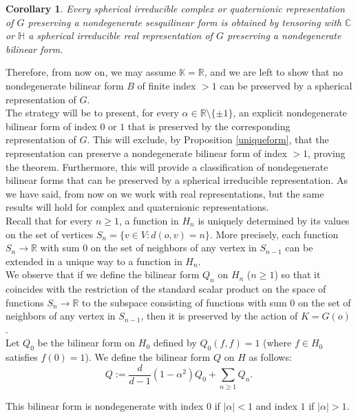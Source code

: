 \documentclass{article}
\theoremstyle{definition}
\theoremstyle{remark}
\theoremstyle{plain}
\newtheorem{cor}[dfn]{Corollary}
\begin{document}
\begin{cor} \label{tensor}
Every spherical irreducible complex or quaternionic representation of $G$ preserving a nondegenerate sesquilinear form is obtained by tensoring with $\mathbb{C}$ or $\mathbb{H}$ a spherical irreducible real representation of $G$ preserving a nondegenerate bilinear form. \\
\end{cor}

Therefore, from now on, we may assume $\mathbb{K}=\mathbb{R}$, and we are left to show that no nondegenerate bilinear form $B$ of finite index $>1$ can be preserved by a spherical representation of $G$. \\

The strategy will be to present, for every $\alpha\in\mathbb{R}\setminus\{\pm 1\}$, an explicit nondegenerate bilinear form of index $0$ or $1$ that is preserved by the corresponding representation of $G$. This will exclude, by Proposition \ref{uniqueform}, that the representation can preserve a nondegenerate bilinear form of index $>1$, proving the theorem. Furthermore, this will provide a classification of nondegenerate bilinear forms that can be preserved by a spherical irreducible representation. As we have said, from now on we work with real representations, but the same results will hold for complex and quaternionic representations. \\

Recall that for every $n\geq 1$, a function in $H_n$ is uniquely determined by its values on the set of vertices $S_n=\{v\in V: d(o,v)=n\}$. More precisely, each function $S_n\rightarrow\mathbb{R}$ with sum $0$ on the set of neighbors of any vertex in $S_{n-1}$ can be extended in a unique way to a function in $H_n$. \\

We observe that if we define the bilinear form $Q_n$ on $H_n$ ($n\geq 1$) so that it coincides with the restriction of the standard scalar product on the space of functions $S_n\rightarrow\mathbb{R}$ to the subspace consisting of functions with sum $0$ on the set of neighbors of any vertex in $S_{n-1}$, then it is preserved by the action of $K=G(o)$. \\

Let $Q_0$ be the bilinear form on $H_0$ defined by $Q_0(f,f)=1$ (where $f\in H_0$ satisfies $f(0)=1$). We define the bilinear form $Q$ on $H$ as follows: $$Q:=\frac{d}{d-1}(1-\alpha^2)Q_0+\sum_{n\geq 1}{Q_n}.$$

This bilinear form is nondegenerate with index $0$ if $\vert\alpha\vert<1$ and index $1$ if $\vert\alpha\vert>1$. \\
\end{document}
